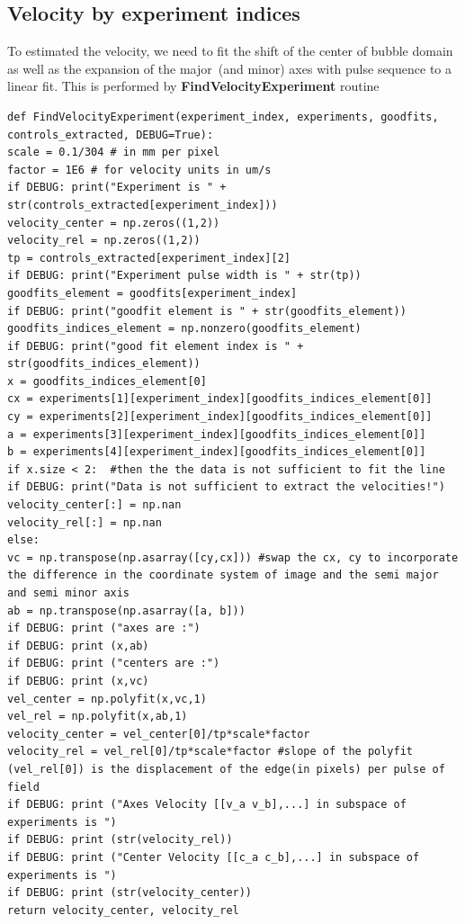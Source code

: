\documentclass[12pt, twoside, a4paper]{article}
\begin{document}
\subsection{Velocity by experiment indices}
To estimated the velocity, we need to fit the shift of the center of bubble domain as well as the expansion of the major~(and minor) axes with pulse sequence to a linear fit. This is performed by \textbf{FindVelocityExperiment} routine
%
\begin{verbatim}
def FindVelocityExperiment(experiment_index, experiments, goodfits, controls_extracted, DEBUG=True):
scale = 0.1/304 # in mm per pixel
factor = 1E6 # for velocity units in um/s
if DEBUG: print("Experiment is " + str(controls_extracted[experiment_index]))
velocity_center = np.zeros((1,2))
velocity_rel = np.zeros((1,2))
tp = controls_extracted[experiment_index][2]
if DEBUG: print("Experiment pulse width is " + str(tp))
goodfits_element = goodfits[experiment_index]
if DEBUG: print("goodfit element is " + str(goodfits_element))
goodfits_indices_element = np.nonzero(goodfits_element)
if DEBUG: print("good fit element index is " + str(goodfits_indices_element))
x = goodfits_indices_element[0]
cx = experiments[1][experiment_index][goodfits_indices_element[0]]
cy = experiments[2][experiment_index][goodfits_indices_element[0]]
a = experiments[3][experiment_index][goodfits_indices_element[0]]
b = experiments[4][experiment_index][goodfits_indices_element[0]]
if x.size < 2:  #then the the data is not sufficient to fit the line
if DEBUG: print("Data is not sufficient to extract the velocities!")
velocity_center[:] = np.nan
velocity_rel[:] = np.nan
else:
vc = np.transpose(np.asarray([cy,cx])) #swap the cx, cy to incorporate the difference in the coordinate system of image and the semi major and semi minor axis
ab = np.transpose(np.asarray([a, b]))
if DEBUG: print ("axes are :")
if DEBUG: print (x,ab)
if DEBUG: print ("centers are :")
if DEBUG: print (x,vc)
vel_center = np.polyfit(x,vc,1)
vel_rel = np.polyfit(x,ab,1)
velocity_center = vel_center[0]/tp*scale*factor
velocity_rel = vel_rel[0]/tp*scale*factor #slope of the polyfit (vel_rel[0]) is the displacement of the edge(in pixels) per pulse of field
if DEBUG: print ("Axes Velocity [[v_a v_b],...] in subspace of experiments is ")
if DEBUG: print (str(velocity_rel))
if DEBUG: print ("Center Velocity [[c_a c_b],...] in subspace of experiments is ")
if DEBUG: print (str(velocity_center))
return velocity_center, velocity_rel
\end{verbatim}
\end{document}
